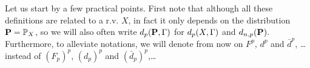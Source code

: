 Let us start by a few practical points.  First note that although all
these definitions are related to a r.v.  $X$, in fact it only depends on the distribution $\mathbf{P} = \mathbb{P}_X$, so we will also often write $d_p(\mathbf{P}, \Gamma)$ for $d_p(X, \Gamma)$ and $d_{n,p}(\mathbf{P})$.
% 
 Furthermore, to alleviate notations, we will denote from now on $F^p$, $d^p$ and $\bar
 d^p$, \dots instead of  $(F_p)^p$, $(d_p)^p$ and $(\bar d_p)^p$,\dots

